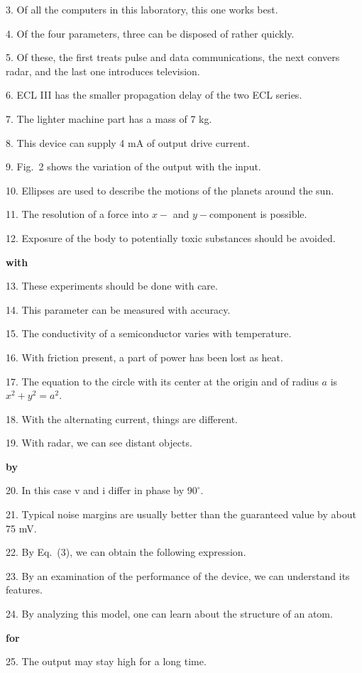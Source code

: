 \documentclass[a4paper,twocolumn,10pt]{article}
\begin{document}
\begin{CJK}{UTF8}{gkai}
	3. Of all the computers in this laboratory, this one works best.

	4. Of the four parameters, three can be disposed of rather quickly.

	5. Of these, the first treats pulse and data communications, the next convers radar,
	and the last one introduces television.

	6. ECL III has the smaller propagation delay of the two ECL series.

	7. The lighter machine part has a mass of 7 kg.

	8. This device can supply 4 mA of output drive current.

	9. Fig.~2 shows the variation of the output with the input.

	10. Ellipses are used to describe the motions of the planets around the sun.

	11. The resolution of a force into $x-$ and $y-$component is possible.

	12. Exposure of the body to potentially toxic substances should be avoided.

	{\bf with}

	13. These experiments should be done with care.

	14. This parameter can be measured with accuracy.

	15. The conductivity of a semiconductor varies with temperature.

	16. With friction present, a part of power has been lost as heat.

	17. The equation to the circle with its center at the origin and of radius $a$
	is $x^2 + y^2 = a^2$.

	18. With the alternating current, things are different.

	19. With radar, we can see distant objects.

	{\bf by}

	20. In this case v and i differ in phase by $90^\circ$.

	21. Typical noise margins are usually better than the guaranteed value
	by about 75 mV.

	22. By Eq.~(3), we can obtain the following expression.

	23. By an examination of the performance of the device, we can understand its features.

	24. By analyzing this model, one can learn about the structure of an atom.

	{\bf for}

	25. The output may stay high for a long time.


\end{CJK}
\end{document}

